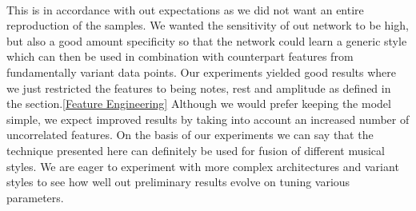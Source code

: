 \documentclass[conference]{IEEEtran}
\begin{document}
\\This is in accordance with out expectations as we did not want an entire reproduction of the samples. We wanted the sensitivity of out network to be high, but also a good amount specificity so that the network could learn a generic style which can then be used in combination with counterpart features from fundamentally variant data points. Our experiments yielded good results where we just restricted the features to being notes, rest and amplitude as defined in the section.\ref{Feature Engineering} Although we would prefer keeping the model simple, we expect improved results by taking into account an increased number of uncorrelated features. On the basis of our experiments we can say that the technique presented here can definitely be used for fusion of different musical styles. We are eager to experiment with more complex architectures and variant styles to see how well out preliminary results evolve on tuning various parameters.












\end{document}

